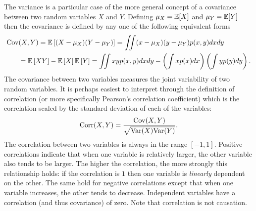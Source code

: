 The variance is a particular case of the more general concept of  a covariance between
two random variables $X$ and $Y$.  Defining $\mu_X=\mathbb{E} [X]$ and $\mu_Y=\mathbb{E} [Y]$
then the covariance is defined by any one of the following equivalent forms
\begin{align}
\operatorname{Cov}& (X,Y) = \mathbb{E} \left[(X-\mu_X)(Y-\mu_Y)\right] = \iint (x-\mu_X)(y-\mu_Y) p(x,y) dxdy \nonumber \\
&= \mathbb{E} \left[XY\right]-\mathbb{E} \left[X\right]\mathbb{E} \left[Y\right] = \iint xyp(x,y) dxdy - \left(\int xp(x) dx\right)
\left(\int yp(y) dy\right).
\end{align}
The covariance between two variables measures the joint variability of two random
variables.  It is perhaps easiest to interpret through the definition of correlation
(or more specifically Pearson's correlation coefficient) which is the correlation
scaled by the standard deviation of each of the variables:
\begin{align}
\operatorname{Corr} (X,Y) = \frac{\operatorname{Cov} (X,Y)}{\sqrt{\mathrm{Var}(X) \mathrm{Var}(Y)}}.
\end{align}
The correlation between two variables is always in the range $[-1,1]$.  Positive
correlations indicate that when one variable is relatively larger, the other variable
also tends to be larger.  The higher the correlation, the more strongly this relationship
holds: if the correlation is $1$ then one variable is \emph{linearly} dependent on the other.  The
same hold for negative correlations except that when one variable increases, the other tends
to decrease.  Independent variables have a correlation (and thus covariance) of zero.
Note that correlation is not causation.